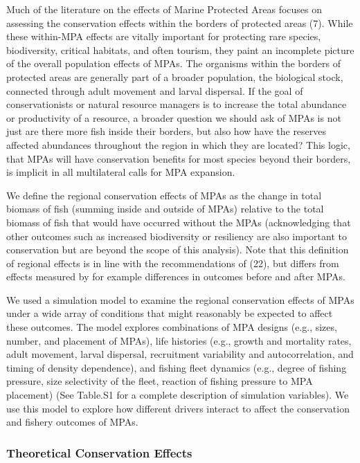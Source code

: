 \documentclass[9pt,twocolumn,twoside,lineno]{pnas-new}
\begin{document}
Much of the literature on the effects of Marine Protected Areas focuses
on assessing the conservation effects within the borders of protected
areas (7). While these within-MPA effects are vitally important for
protecting rare species, biodiversity, critical habitats, and often
tourism, they paint an incomplete picture of the overall population
effects of MPAs. The organisms within the borders of protected areas are
generally part of a broader population, the biological stock, connected
through adult movement and larval dispersal. If the goal of
conservationists or natural resource managers is to increase the total
abundance or productivity of a resource, a broader question we should
ask of MPAs is not just are there more fish inside their borders, but
also how have the reserves affected abundances throughout the region in
which they are located? This logic, that MPAs will have conservation
benefits for most species beyond their borders, is implicit in all
multilateral calls for MPA expansion.

We define the regional conservation effects of MPAs as the change in
total biomass of fish (summing inside and outside of MPAs) relative to
the total biomass of fish that would have occurred without the MPAs
(acknowledging that other outcomes such as increased biodiversity or
resiliency are also important to conservation but are beyond the scope
of this analysis). Note that this definition of regional effects is in
line with the recommendations of (22), but differs from effects measured
by for example differences in outcomes before and after MPAs.

We used a simulation model to examine the regional conservation effects
of MPAs under a wide array of conditions that might reasonably be
expected to affect these outcomes. The model explores combinations of
MPA designs (e.g., sizes, number, and placement of MPAs), life histories
(e.g., growth and mortality rates, adult movement, larval dispersal,
recruitment variability and autocorrelation, and timing of density
dependence), and fishing fleet dynamics (e.g., degree of fishing
pressure, size selectivity of the fleet, reaction of fishing pressure to
MPA placement) (See Table.S1 for a complete description of simulation
variables). We use this model to explore how different drivers interact
to affect the conservation and fishery outcomes of MPAs.

\hypertarget{conservation}{%
\subsubsection*{Theoretical Conservation Effects}\label{conservation}}
\end{document}

